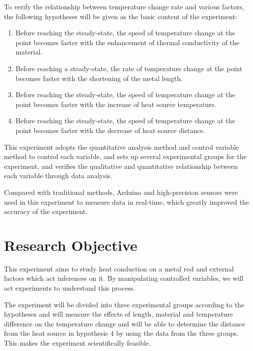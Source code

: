 \documentclass[a4paper,12pt]{article}
\begin{document}
To verify the relationship between temperature change rate and various factors, the following hypotheses will be given as the basic content of the experiment:
\begin{enumerate}
	\item Before reaching the steady-state, the speed of temperature change at the point becomes faster with the enhancement of thermal conductivity of the material.
	\item Before reaching a steady-state, the rate of temperature change at the point becomes faster with the shortening of the metal length.
	\item Before reaching the steady-state, the speed of temperature change at the point becomes faster with the increase of heat source temperature.
	\item Before reaching the steady-state, the speed of temperature change at the point becomes faster with the decrease of heat source distance.
\end{enumerate}





This experiment adopts the quantitative analysis method and control variable method to control each variable, and sets up several experimental groups for the experiment, and verifies the qualitative and quantitative relationship between each variable through data analysis.




Compared with traditional methods\cite{__2015}, Arduino and high-precision sensors were used in this experiment to measure data in real-time, which greatly improved the accuracy of the experiment.







\section{Research Objective}
This experiment aims to study heat conduction on a metal rod and external factors which act inferences on it. By manipulating controlled variables, we will act experiments to understand this process.



The experiment will be divided into three experimental groups according to the hypotheses and will measure the effects of length, material and temperature difference on the temperature change and will be able to determine the distance from the heat source in hypothesis 4 by using the data from the three groups. This makes the experiment scientifically feasible.
\end{document}
